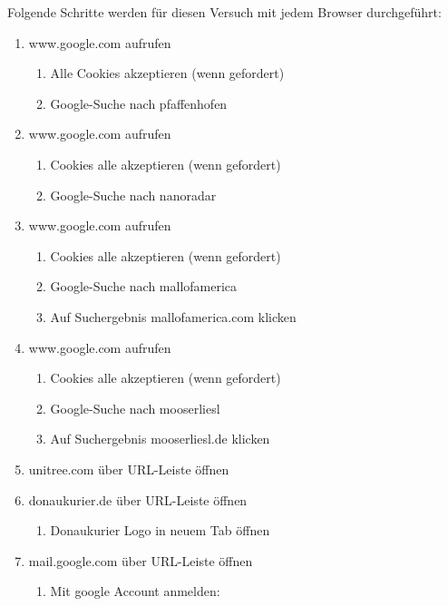 Folgende Schritte werden für diesen Versuch mit jedem Browser durchgeführt: 
\begin{enumerate}
\item  www.google.com aufrufen
	\begin{enumerate}[label*=\arabic*.]
	\item Alle Cookies akzeptieren (wenn gefordert)
	\item Google-Suche nach \glqq{}pfaffenhofen\grqq{}
	\end{enumerate}
\item www.google.com aufrufen
	\begin{enumerate}[label*=\arabic*.]
	\item Cookies alle akzeptieren (wenn gefordert)
	\item Google-Suche nach \glqq{}nanoradar\grqq{}
	\end{enumerate}
\item www.google.com aufrufen
	\begin{enumerate}[label*=\arabic*.]
	\item Cookies alle akzeptieren (wenn gefordert)
	\item Google-Suche nach \glqq{}mallofamerica\grqq{}
	\item Auf Suchergebnis \glqq{}mallofamerica.com\grqq{} klicken
	\end{enumerate}
\item www.google.com aufrufen
	\begin{enumerate}[label*=\arabic*.]
	\item Cookies alle akzeptieren (wenn gefordert)
	\item Google-Suche nach \glqq{}mooserliesl\grqq{}
	\item Auf Suchergebnis \glqq{}mooserliesl.de\grqq{} klicken
	\end{enumerate}
\item \glqq{}unitree.com\grqq{} über URL-Leiste öffnen
\item \glqq{}donaukurier.de\grqq{} über URL-Leiste öffnen
	\begin{enumerate}[label*=\arabic*.]
	\item Donaukurier Logo in neuem Tab öffnen
	\end{enumerate}
\item \glqq{}mail.google.com\grqq{} über URL-Leiste öffnen
	\begin{enumerate}[label*=\arabic*.]
	\item Mit google Account anmelden: 
			\begin{enumerate}[label*=\arabic*.]

\end{enumerate}
\end{enumerate}
\end{enumerate}
